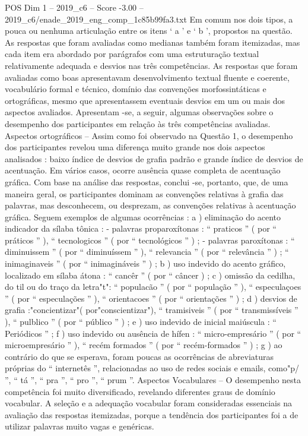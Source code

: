 \begin{textsample}{POS Dim 1 – 2019\_c6 – Score -3.00 – 2019\_c6/enade\_2019\_eng\_comp\_1c85b99fa3.txt}
Em comum nos dois tipos, a pouca ou nenhuma articulação entre os itens ‘ a ’ e ‘ b ’, propostos na questão.
As respostas que foram avaliadas como medianas também foram itemizadas, mas cada item era abordado por parágrafos com uma estruturação textual relativamente adequada e desvios nas três competências.
As respostas que foram avaliadas como boas apresentavam desenvolvimento textual fluente e coerente, vocabulário formal e técnico, domínio das convenções morfossintáticas e ortográficas, mesmo que apresentassem eventuais desvios em um ou mais dos aspectos avaliados.
Apresentam -se, a seguir, algumas observações sobre o desempenho dos participantes em relação às três competências avaliadas.
Aspectos ortográficos – Assim como foi observado na Questão 1, o desempenho dos participantes revelou uma diferença muito grande nos dois aspectos analisados : baixo índice de desvios de grafia padrão e grande índice de desvios de acentuação.
Em vários casos, ocorre ausência quase completa de acentuação gráfica.
Com base na análise das respostas, conclui -se, portanto, que, de uma maneira geral, os participantes dominam as convenções relativas à grafia das palavras, mas desconhecem, ou desprezam, as convenções relativas à acentuação gráfica.
Seguem exemplos de algumas ocorrências : a ) eliminação do acento indicador da sílaba tônica : - palavras proparoxítonas : “ praticos ” ( por “ práticos ” ), “ tecnologicos ” ( por “ tecnológicos ” ) ; - palavras paroxítonas : “ diminuissem ” ( por “ diminuíssem ” ), “ relevancia ” ( por “ relevância ” ) ; “ inimaginaveis ” ( por “ inimagináveis ” ) ; b ) uso indevido do acento gráfico, localizado em sílaba átona : “ cancêr ” ( por “ câncer ) ; c ) omissão da cedilha, do til ou do traço da letra"t": “ populacão ” ( por “ população ” ), “ especulaçoes ” ( por “ especulações ” ), “ orientacoes ” ( por “ orientações ” ) ; d ) desvios de grafia :"concientizar"( por"conscientizar"), “ tramisiveis ” ( por “ transmissíveis ” ), “ pulblico ” ( por “ público ” ) ; e ) uso indevido de inicial maiúscula : “ Periódicos ” ; f ) uso indevido ou ausência de hífen : “ micro-empresário ” ( por “ microempresário ” ), “ recém formados ” ( por “ recém-formados ” ) ; g ) ao contrário do que se esperava, foram poucas as ocorrências de abreviaturas próprias do “ internetês ”, relacionadas ao uso de redes sociais e emails, como"p/ ”, “ tá ”, “ pra ”, “ pro ”, “ prum ”.
Aspectos Vocabulares – O desempenho nesta competência foi muito diversificado, revelando diferentes graus de domínio vocabular.
A seleção e a adequação vocabular foram consideradas essenciais na avaliação das respostas itemizadas, porque a tendência dos participantes foi a de utilizar palavras muito vagas e genéricas.

\end{textsample}
